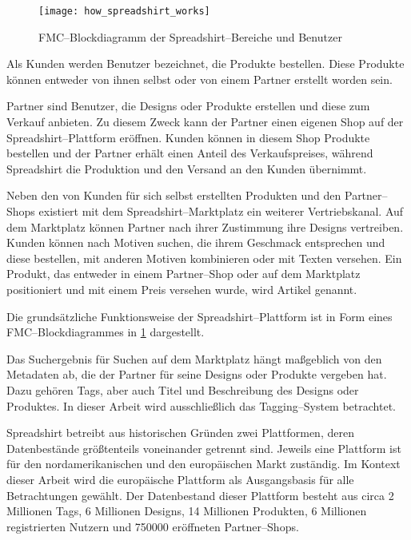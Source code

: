 \begin{figure}[ht]
\centering
\texttt{[image: how\_spreadshirt\_works]}
\caption{FMC--Blockdiagramm der Spreadshirt--Bereiche und Benutzer}
\label{fig:howspreadshirtworks}
\end{figure}

Als Kunden werden Benutzer bezeichnet, die Produkte bestellen. Diese Produkte können entweder von ihnen selbst oder von einem Partner erstellt worden sein. 

Partner sind Benutzer, die Designs oder Produkte erstellen und diese zum Verkauf anbieten. Zu diesem Zweck kann der Partner einen eigenen Shop auf der Spreadshirt--Plattform eröffnen. Kunden können in diesem Shop Produkte bestellen und der Partner erhält einen Anteil des Verkaufspreises, während Spreadshirt die Produktion und den Versand an den Kunden übernimmt.

Neben den von Kunden für sich selbst erstellten Produkten und den Partner--Shops existiert mit dem Spreadshirt--Marktplatz ein weiterer Vertriebskanal. Auf dem Marktplatz können Partner nach ihrer Zustimmung ihre Designs vertreiben. Kunden können nach Motiven suchen, die ihrem Geschmack entsprechen und diese bestellen, mit anderen Motiven kombinieren oder mit Texten versehen. Ein Produkt, das entweder in einem Partner--Shop oder auf dem Marktplatz positioniert und mit einem Preis versehen wurde, wird Artikel genannt.

Die grundsätzliche Funktionsweise der Spreadshirt--Plattform ist in Form eines FMC--Blockdiagrammes in \cref{fig:howspreadshirtworks} dargestellt.

Das Suchergebnis für Suchen auf dem Marktplatz hängt maßgeblich von den Metadaten ab, die der Partner für seine Designs oder Produkte vergeben hat. Dazu gehören Tags, aber auch Titel und Beschreibung des Designs oder Produktes. In dieser Arbeit wird ausschließlich das Tagging--System betrachtet.

\label{platforms}
Spreadshirt betreibt aus historischen Gründen zwei Plattformen, deren Datenbestände größtenteils voneinander getrennt sind. Jeweils eine Plattform ist für den nordamerikanischen und den europäischen Markt zuständig. Im Kontext dieser Arbeit wird die europäische Plattform als Ausgangsbasis für alle Betrachtungen gewählt. Der Datenbestand dieser Plattform besteht aus circa 2 Millionen Tags, 6 Millionen Designs, 14 Millionen Produkten, 6 Millionen registrierten Nutzern und \num{750000} eröffneten Partner--Shops.

\clearpage

